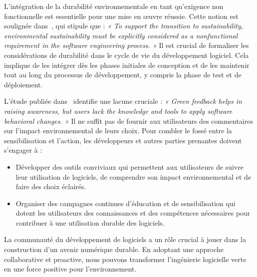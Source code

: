 L'intégration de la durabilité environnementale en tant qu'exigence non fonctionnelle est essentielle pour une mise en œuvre réussie. Cette notion est soulignée dans~\cite{SafetySecuritySustainability}, qui stipule que : \emph{« To support the transition to sustainability, environmental sustainability must be explicitly considered as a nonfunctional requirement in the software engineering process. »} Il est crucial de formaliser les considérations de durabilité dans le cycle de vie du développement logiciel. Cela implique de les intégrer dès les phases initiales de conception et de les maintenir tout au long du processus de développement, y compris la phase de test et de déploiement.


L'étude publiée dans~\cite{ImpactGreenFeedback} identifie une lacune cruciale : \emph{« Green feedback helps in raising awareness, but users lack the knowledge and tools to apply software behavioral changes. »} Il ne suffit pas de fournir aux utilisateurs des commentaires sur l'impact environnemental de leurs choix. Pour combler le fossé entre la sensibilisation et l'action, les développeurs et autres parties prenantes doivent s'engager à :

\begin{itemize}
    \item Développer des outils conviviaux qui permettent aux utilisateurs de suivre leur utilisation de logiciels, de comprendre son impact environnemental et de faire des choix éclairés.
    \item Organiser des campagnes continues d'éducation et de sensibilisation qui dotent les utilisateurs des connaissances et des compétences nécessaires pour contribuer à une utilisation durable des logiciels.
\end{itemize}


La communauté du développement de logiciels a un rôle crucial à jouer dans la construction d'un avenir numérique durable. En adoptant une approche collaborative et proactive, nous pouvons transformer l'ingénierie logicielle verte en une force positive pour l'environnement.


